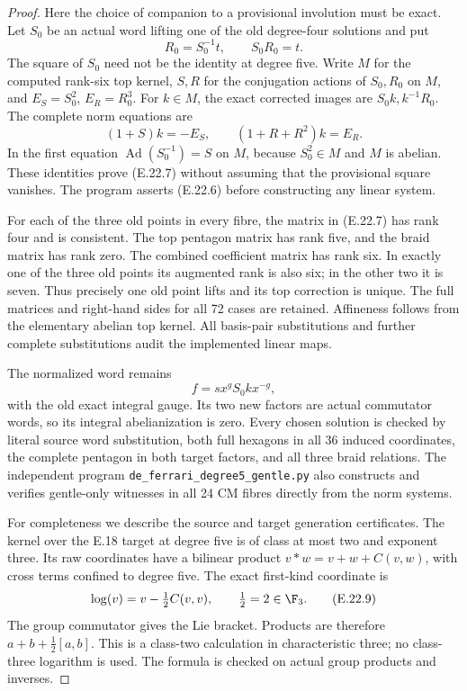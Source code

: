 \begin{proof}
Here the choice of companion
to a provisional involution
must be exact. Let $S_0$ be
an actual word lifting one
of the old degree-four
solutions and put
\[
       R_0=S_0^{-1}t,
       \qquad S_0R_0=t.
 \tag{E.22.6}
\]
The square of $S_0$ need
not be the identity at
degree five. Write $M$ for
the computed rank-six top
kernel, $S,R$ for the
conjugation actions of
$S_0,R_0$ on $M$, and
$E_S=S_0^2$, $E_R=R_0^3$.
For $k\in M$, the exact
corrected images are
$S_0k,k^{-1}R_0$. The
complete norm equations are
\[
 (1+S)k=-E_S,\qquad
 (1+R+R^2)k=E_R.
 \tag{E.22.7}
\]
In the first equation
$\operatorname{Ad}(S_0^{-1})=S$
on $M$, because $S_0^2\in M$
and $M$ is abelian. These
identities prove (E.22.7)
without assuming that the
provisional square vanishes.
The program asserts (E.22.6)
before constructing any
linear system.

For each of the three old
points in every fibre, the
matrix in (E.22.7) has rank
four and is consistent.
The top pentagon matrix has
rank five, and the braid
matrix has rank zero. The
combined coefficient matrix
has rank six. In exactly
one of the three old points
its augmented rank is also
six; in the other two it
is seven. Thus precisely
one old point lifts and
its top correction is
unique. The full matrices
and right-hand sides for
all 72 cases are retained.
Affineness follows from
the elementary abelian
top kernel. All basis-pair
substitutions and further
complete substitutions
audit the implemented
linear maps.

The normalized word remains
\[
          f=sx^g S_0k x^{-g},
 \tag{E.22.8}
\]
with the old exact integral
gauge. Its two new factors
are actual commutator words,
so its integral
abelianization is zero.
Every chosen solution is
checked by literal source
word substitution, both
full hexagons in all
36 induced coordinates,
the complete pentagon in
both target factors, and
all three braid relations.
The independent program
\texttt{de\_ferrari\_degree5\_gentle.py}
also constructs and verifies
gentle-only witnesses in
all 24 CM fibres directly
from the norm systems.

For completeness we describe
the source and target
generation certificates.
The kernel over the E.18
target at degree five is
of class at most two and
exponent three. Its raw
coordinates have a
bilinear product
$v*w=v+w+C(v,w)$, with
cross terms confined to
degree five. The exact
first-kind coordinate is
\[
       \log(v)=v-\tfrac12 C(v,v),
       \qquad \tfrac12=2\in\F_3.
 \tag{E.22.9}
\]
The group commutator gives
the Lie bracket. Products
are therefore
$a+b+\tfrac12[a,b]$.
This is a class-two
calculation in
characteristic three;
no class-three logarithm
is used. The formula is
checked on actual group
products and inverses.


\end{proof}
